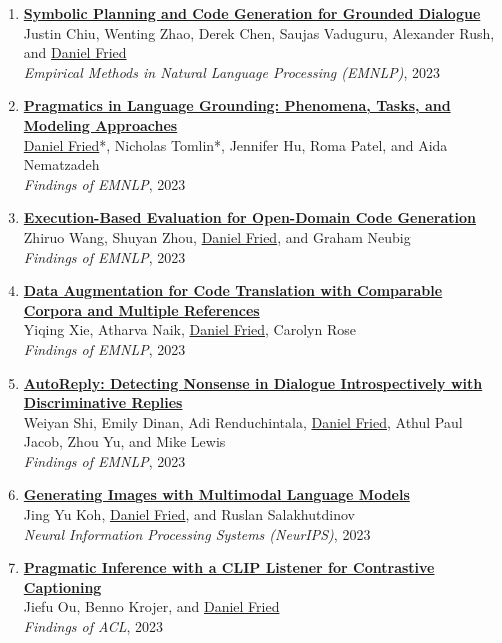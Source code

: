 \begin{enumerate}[leftmargin=-1mm,partopsep=0pt]
\item \href{https://arxiv.org/abs/2310.17140}{\textbf{Symbolic Planning and Code Generation for Grounded Dialogue }} \\
  Justin Chiu, Wenting Zhao, Derek Chen, Saujas Vaduguru, Alexander Rush, and \underline{Daniel Fried}\\
  \emph{Empirical Methods in Natural Language Processing (EMNLP)}, 2023

\item \href{https://arxiv.org/abs/2211.08371}{\textbf{Pragmatics in Language Grounding: Phenomena, Tasks, and Modeling Approaches}} \\
  \underline{Daniel Fried}*, Nicholas Tomlin*, Jennifer Hu, Roma Patel, and Aida Nematzadeh\\
  \emph{Findings of EMNLP}, 2023

\item \href{https://arxiv.org/abs/2212.10481}{\textbf{Execution-Based Evaluation for Open-Domain Code Generation}} \\
  Zhiruo Wang, Shuyan Zhou, \underline{Daniel Fried}, and Graham Neubig\\
  \emph{Findings of EMNLP}, 2023

\item \href{https://arxiv.org/abs/2311.00317}{\textbf{Data Augmentation for Code Translation with Comparable Corpora and Multiple References}} \\
  Yiqing Xie, Atharva Naik, \underline{Daniel Fried}, Carolyn Rose\\
  \emph{Findings of EMNLP}, 2023

\item \href{https://arxiv.org/abs/2211.12615}{\textbf{AutoReply: Detecting Nonsense in Dialogue Introspectively with Discriminative Replies}} \\
  Weiyan Shi, Emily Dinan, Adi Renduchintala, \underline{Daniel Fried}, Athul Paul Jacob, Zhou Yu, and Mike Lewis\\
  \emph{Findings of EMNLP}, 2023

\item \href{https://arxiv.org/abs/2305.17216}{\textbf{Generating Images with Multimodal Language Models}} \\
  Jing Yu Koh, \underline{Daniel Fried}, and Ruslan Salakhutdinov\\
  \emph{Neural Information Processing Systems (NeurIPS)}, 2023

\item \href{https://arxiv.org/abs/2306.08818}{\textbf{Pragmatic Inference with a CLIP Listener for Contrastive Captioning}} \\
  Jiefu Ou, Benno Krojer, and \underline{Daniel Fried}\\
  \emph{Findings of ACL}, 2023


\end{enumerate}
